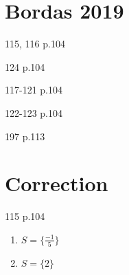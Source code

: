 \documentclass[10pt,a4paper,openany,twoside]{book}
\begin{document}
\newpage
{}
\section*{Bordas 2019}

    \begin{bookexos}{115, 116 p.104}\end{bookexos}
    \begin{bookexos}{124 p.104}\end{bookexos}
    \begin{bookexos}{117-121 p.104}\end{bookexos}
    \begin{bookexos}{122-123 p.104}\end{bookexos}

    \begin{bookexo}{197 p.113}\end{bookexo}

\newpage
\section*{Correction}
\setcounter{sectionexo}{0}
    \begin{bookexo}{115 p.104}
        \begin{enumerate}[label=\alph*.]
            \item 
            $S=\{\frac{-1}{5}\}$
            \item 
            $S=\{2\}$
        \end{enumerate}
    \end{bookexo}
\end{document}
